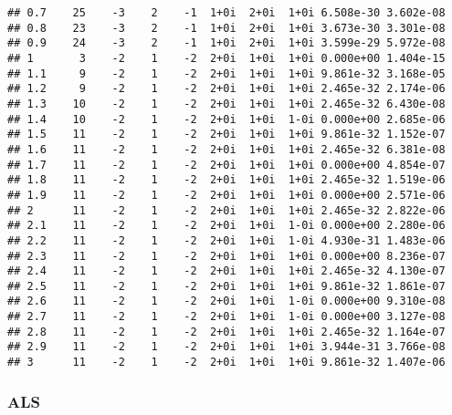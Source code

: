 \documentclass[
  12pt,
]{article}
\begin{document}
\begin{verbatim}
## 0.7    25    -3    2    -1  1+0i  2+0i  1+0i 6.508e-30 3.602e-08
## 0.8    23    -3    2    -1  1+0i  2+0i  1+0i 3.673e-30 3.301e-08
## 0.9    24    -3    2    -1  1+0i  2+0i  1+0i 3.599e-29 5.972e-08
## 1       3    -2    1    -2  2+0i  1+0i  1+0i 0.000e+00 1.404e-15
## 1.1     9    -2    1    -2  2+0i  1+0i  1+0i 9.861e-32 3.168e-05
## 1.2     9    -2    1    -2  2+0i  1+0i  1+0i 2.465e-32 2.174e-06
## 1.3    10    -2    1    -2  2+0i  1+0i  1+0i 2.465e-32 6.430e-08
## 1.4    10    -2    1    -2  2+0i  1+0i  1-0i 0.000e+00 2.685e-06
## 1.5    11    -2    1    -2  2+0i  1+0i  1+0i 9.861e-32 1.152e-07
## 1.6    11    -2    1    -2  2+0i  1+0i  1+0i 2.465e-32 6.381e-08
## 1.7    11    -2    1    -2  2+0i  1+0i  1+0i 0.000e+00 4.854e-07
## 1.8    11    -2    1    -2  2+0i  1+0i  1+0i 2.465e-32 1.519e-06
## 1.9    11    -2    1    -2  2+0i  1+0i  1+0i 0.000e+00 2.571e-06
## 2      11    -2    1    -2  2+0i  1+0i  1+0i 2.465e-32 2.822e-06
## 2.1    11    -2    1    -2  2+0i  1+0i  1-0i 0.000e+00 2.280e-06
## 2.2    11    -2    1    -2  2+0i  1+0i  1-0i 4.930e-31 1.483e-06
## 2.3    11    -2    1    -2  2+0i  1+0i  1+0i 0.000e+00 8.236e-07
## 2.4    11    -2    1    -2  2+0i  1+0i  1+0i 2.465e-32 4.130e-07
## 2.5    11    -2    1    -2  2+0i  1+0i  1+0i 9.861e-32 1.861e-07
## 2.6    11    -2    1    -2  2+0i  1+0i  1-0i 0.000e+00 9.310e-08
## 2.7    11    -2    1    -2  2+0i  1+0i  1-0i 0.000e+00 3.127e-08
## 2.8    11    -2    1    -2  2+0i  1+0i  1+0i 2.465e-32 1.164e-07
## 2.9    11    -2    1    -2  2+0i  1+0i  1+0i 3.944e-31 3.766e-08
## 3      11    -2    1    -2  2+0i  1+0i  1+0i 9.861e-32 1.407e-06
\end{verbatim}

\normalsize

\subsubsection{ALS}\label{als-1}

\footnotesize
\end{document}
